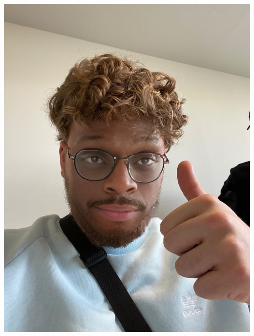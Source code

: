 \documentclass[a4paper,11pt]{article}
\begin{document}
\begin{minipage}{0.3\textwidth} %
    \begin{center}
        \includegraphics[width=\textwidth]{images/Dimitri.jpeg} %
    \end{center}
\end{minipage}
\end{document}
